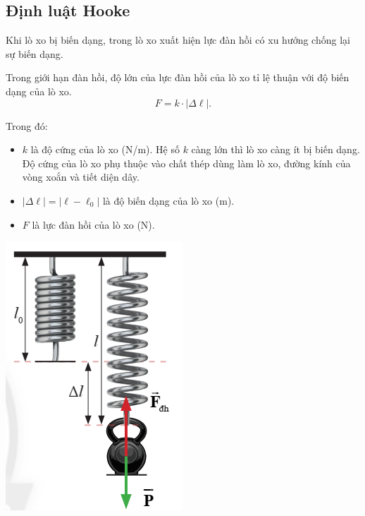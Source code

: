 \subsection{Định luật Hooke}
\begin{minipage}{0.6\textwidth}
	
	Khi lò xo bị biến dạng, trong lò xo xuất hiện lực đàn hồi có xu hướng chống lại sự biến dạng. 			
	
	Trong giới hạn đàn hồi, độ lớn của lực đàn hồi của lò xo tỉ lệ thuận với độ biến dạng của lò xo.
	\begin{equation*}
		F= k \cdot |\Delta \ell|.
	\end{equation*}
	
	Trong đó:
	\begin{itemize}
		\item $k$ là độ cứng của lò xo (N/m). Hệ số $k$ càng lớn thì lò xo càng ít bị biến dạng. Độ cứng của lò xo phụ thuộc vào chất thép dùng làm lò xo, đường kính của vòng xoắn và tiết diện
		dây.
		\item $|\Delta \ell|=|\ell-\ell_0|$ là độ biến dạng của lò xo (m).
		\item $F$ là lực đàn hồi của lò xo (N).
	\end{itemize}
\end{minipage}
\begin{minipage}{0.4\textwidth}
	\begin{center}
		\includegraphics[scale=0.65]{../figs/G10-028-5}
	\end{center}
	
\end{minipage}
